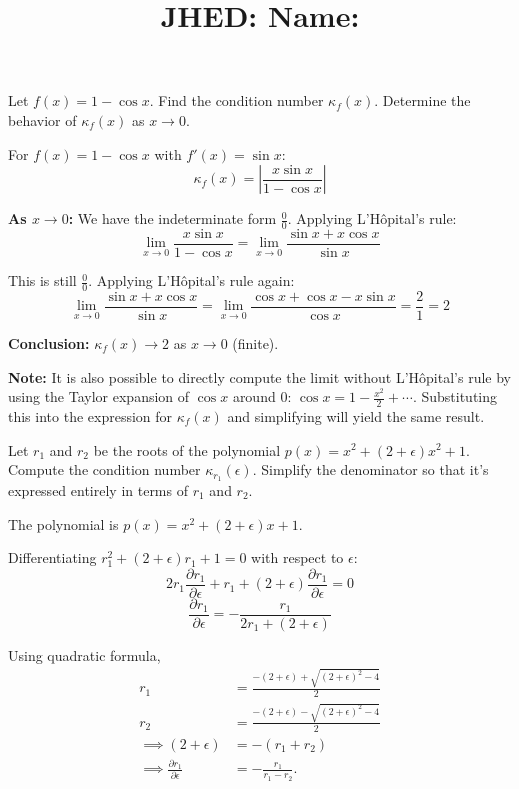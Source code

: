 \documentclass[reqno, answers]{exam}
\title{\normalsize{
  JHED: \underline{\hspace{4cm}} \hspace{1em} Name: \underline{\hspace{9cm}}}
   }
\author{}
\date{}
\begin{document}
\maketitle
\vspace{-2cm} %

\begin{questions}

  \question Let $f(x) = 1 - \cos x$. Find the condition number $\kappa_f(x)$. Determine the behavior of $\kappa_f(x)$ as $x \to 0$.
  \begin{solution}
    For $f(x) = 1 - \cos x$ with $f'(x) = \sin x$:
    $$\kappa_f(x) = \left|\frac{x \sin x}{1 - \cos x}\right|$$

    \textbf{As $x \to 0$:} We have the indeterminate form $\frac{0}{0}$. Applying L'Hôpital's rule:
    $$\lim_{x \to 0} \frac{x \sin x}{1 - \cos x} = \lim_{x \to 0} \frac{\sin x + x \cos x}{\sin x}$$

    This is still $\frac{0}{0}$. Applying L'Hôpital's rule again:
    $$\lim_{x \to 0} \frac{\sin x + x \cos x}{\sin x} = \lim_{x \to 0} \frac{\cos x + \cos x - x \sin x}{\cos x} = \frac{2}{1} = 2$$

    \textbf{Conclusion:} $\kappa_f(x) \to 2$ as $x \to 0$ (finite).
    
    \textbf{Note:} It is also possible to directly compute the limit without L'Hôpital's rule by using the Taylor expansion of $\cos x$ around $0$: $\cos x = 1 - \frac{x^2}{2} + \cdots$. Substituting this into the expression for $\kappa_f(x)$ and simplifying will yield the same result.
  \end{solution}



  \newpage
  \question
  Let $r_1$ and $r_2$ be the roots of the polynomial $p(x) = x^2 + (2 + \epsilon)x^2 + 1$. Compute the condition number $\kappa_{r_1}(\epsilon)$. Simplify the denominator so that it's expressed entirely in terms of $r_1$ and $r_2$.

  \begin{solution}
    The polynomial is $p(x) = x^2 + (2 + \epsilon)x + 1$.

    Differentiating $r_1^2 + (2 + \epsilon)r_1 + 1 = 0$ with respect to $\epsilon$:
    $$2r_1\frac{\partial r_1}{\partial \epsilon} + r_1 + (2 + \epsilon)\frac{\partial r_1}{\partial \epsilon} = 0$$
    $$\frac{\partial r_1}{\partial \epsilon} = -\frac{r_1}{2r_1 + (2 + \epsilon)}$$

    Using quadratic formula,
    \begin{align*}
      r_1                                             & = \frac{-(2 + \epsilon) + \sqrt{(2 + \epsilon)^2 - 4}}{2} \\
      r_2                                             & = \frac{-(2 + \epsilon) - \sqrt{(2 + \epsilon)^2 - 4}}{2} \\
      \implies
      (2 + \epsilon)                                  & = -(r_1 + r_2)                                            \\
      \implies \frac{\partial r_1}{\partial \epsilon} & = -\frac{r_1}{r_1 - r_2}.
    \end{align*}



\end{solution}
\end{questions}
\end{document}
